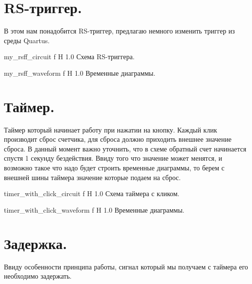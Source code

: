 \documentclass{bmstu}
\begin{document}
	\section{RS-триггер.}
	
	\begin{flushleft}
		В этом нам понадобится RS-триггер, предлагаю немного изменить триггер из среды Quartus.
	\end{flushleft}

	{my_rsff_circuit}
	{f} %
	{H} %
	{1.0\textwidth} %
	{Схема RS-триггера.} %
	
	{my_rsff_waveform}
	{f} %
	{H} %
	{1.0\textwidth} %
	{Временные диаграммы.} %

	\section{Таймер.}
	
	\begin{flushleft}
		Таймер который начинает работу при нажатии на кнопку. 
		Каждый клик производит сброс счетчика, для сброса
		должно приходить внешнее значение сброса. В данный момент важно уточнить, 
		что в схеме обратный счет начинается спустя 1 секунду бездействия.
		Ввиду того что значение может менятся,
		и возможно такое что надо будет строить временные диаграммы,
		то берем с внешней шины таймера значение которые подаем на сброс.
	\end{flushleft}

	{timer_with_click_circuit}
	{f} %
	{H} %
	{1.0\textwidth} %
	{Схема таймера с кликом.} %
	
	{timer_with_click_waveform}
	{f} %
	{H} %
	{1.0\textwidth} %
	{Временные диаграммы.} %

	\section{Задержка.}

	\begin{flushleft}	
		Ввиду особенности принципа работы, сигнал который мы получаем с таймера его необходимо задержать.
	\end{flushleft}
	
\end{document}
